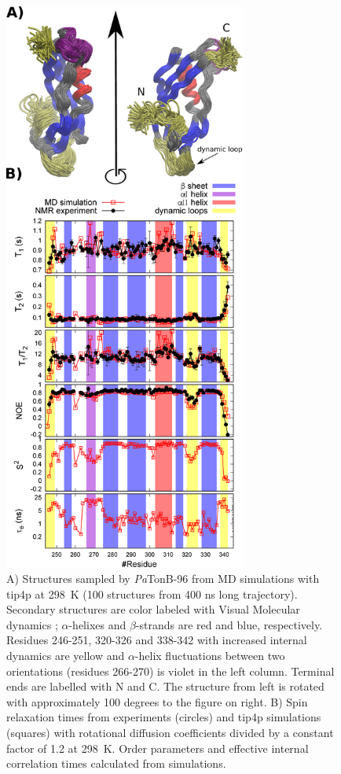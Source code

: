 \documentclass[journal=jpcbfk,manuscript=article]{achemso}
\begin{document}
\begin{figure}[p]
  \includegraphics[width=8.0cm]{../Figs/RELdataPsTonB2.eps}%
  \caption{A) Structures sampled by {\it Pa}TonB-96 from MD simulations with tip4p at 298~K
    (100 structures from 400 ns long trajectory). Secondary structures
    are color labeled with Visual Molecular dynamics \cite{frishman95,humphrey96};
    $\alpha$-helixes and $\beta$-strands are red and blue, respectively.
    Residues 246-251, 320-326 and 338-342 with increased internal dynamics are yellow and
    $\alpha$-helix fluctuations between two orientations (residues 266-270) is violet in the left column.
    Terminal ends are labelled with N and C.
    The structure from left is rotated with approximately 100 degrees to the figure on right.
    B) Spin relaxation times from experiments (circles) and tip4p
    simulations (squares) with rotational diffusion coefficients divided by a
    constant factor of 1.2 at 298~K. Order parameters and effective internal correlation
    times calculated from simulations. \label{PsTonBrelaxationDATAscaled}}%
\end{figure}
\end{document}
